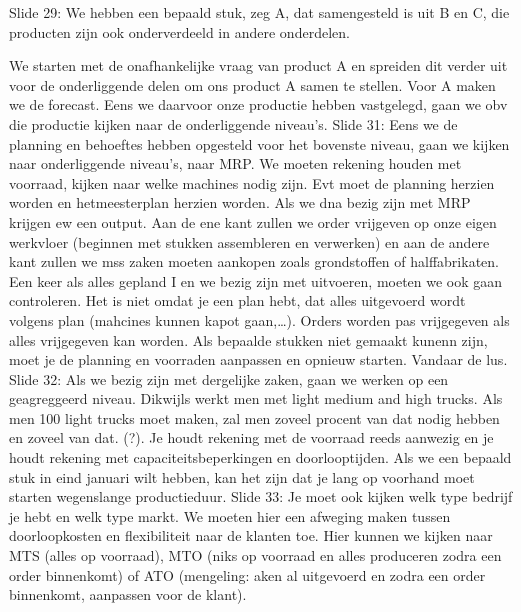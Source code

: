 \documentclass[10pt,a4paper]{report}
\begin{document}









Slide 29: We hebben een bepaald stuk, zeg A, dat samengesteld is uit B en C, die producten zijn ook onderverdeeld in andere onderdelen. 












We starten met de onafhankelijke vraag van product A en spreiden dit verder uit voor de onderliggende delen om ons product A samen te stellen. Voor A maken we de forecast. Eens we daarvoor onze productie hebben vastgelegd, gaan we obv die productie kijken naar de onderliggende niveau's.
Slide 31: Eens we de planning en behoeftes hebben opgesteld voor het bovenste niveau, gaan we kijken naar onderliggende niveau's, naar MRP. We moeten rekening houden met voorraad, kijken naar welke machines nodig zijn. Evt moet de planning herzien worden en hetmeesterplan herzien worden. Als we dna bezig zijn met MRP krijgen ew een output. Aan de ene kant zullen we order vrijgeven op onze eigen werkvloer (beginnen met stukken assembleren en verwerken) en aan de andere kant zullen we mss zaken moeten aankopen zoals grondstoffen of halffabrikaten. Een keer als alles gepland I en we bezig zijn met uitvoeren, moeten we ook gaan controleren. Het is niet omdat je een plan hebt, dat alles uitgevoerd wordt volgens plan (mahcines kunnen kapot gaan,…). Orders worden pas vrijgegeven als alles vrijgegeven kan worden.
Als bepaalde stukken niet gemaakt kunenn zijn, moet je de planning en voorraden aanpassen en opnieuw starten. Vandaar de lus.
Slide 32: Als we bezig zijn met dergelijke zaken, gaan we werken op een geagreggeerd niveau. Dikwijls werkt men met light medium and high trucks.
Als men 100 light trucks moet maken, zal men zoveel procent van dat nodig hebben en zoveel van dat. (?).
Je houdt rekening met de voorraad reeds aanwezig en je houdt rekening met capaciteitsbeperkingen en doorlooptijden. Als we een bepaald stuk in eind januari wilt hebben, kan het zijn dat je lang op voorhand moet starten wegenslange productieduur. 
Slide 33: Je moet ook kijken welk type bedrijf je hebt en welk type markt. We moeten hier een afweging maken tussen doorloopkosten en flexibiliteit naar de klanten toe. Hier kunnen we kijken naar MTS (alles op voorraad), MTO (niks op voorraad en alles produceren zodra een order binnenkomt) of ATO (mengeling: aken al uitgevoerd en zodra een order binnenkomt, aanpassen voor de klant).
\end{document}

